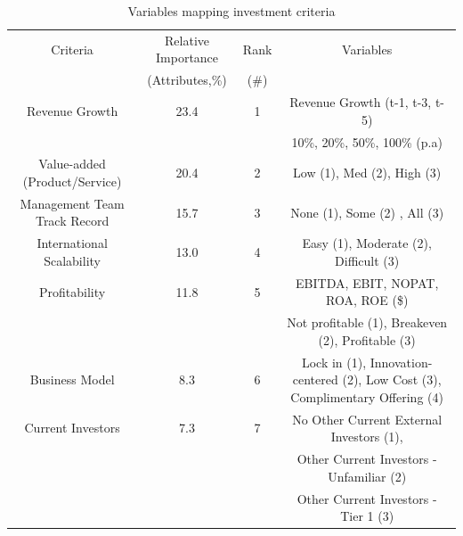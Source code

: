 \documentclass[12pt]{article}
\begin{document}
\begin{landscape}
	\begin{table}[H]
		\centering
		\begin{tabular}{|c | c | c | c|} 
		 \hline
		 Criteria & Relative Importance & Rank & Variables \\ 
				   & (Attributes,\%) 	& (\#) & \\ [0.5ex] 
		 \hline\hline
		 Revenue Growth & 23.4 & 1 & Revenue Growth (t-1, t-3, t-5) \\ 
		 				&  	   &   & 10\%, 20\%, 50\%, 100\% (p.a) \\ 
		 \hline
		 Value-added (Product/Service)& 20.4 & 2 & Low (1), Med (2), High (3) \\
		 \hline
		 Management Team Track Record& 15.7 & 3 & None (1), Some (2) , All (3) \\
		 \hline
		 International Scalability & 13.0  & 4 & Easy (1), Moderate (2), Difficult (3) \\
		 \hline
		 Profitability & 11.8 & 5 & EBITDA, EBIT, NOPAT, ROA, ROE (\$) \\ 
						 &      &   & Not profitable (1), Breakeven (2), Profitable (3) \\
		 \hline
		 Business Model & 8.3 & 6 & Lock in (1), Innovation-centered (2), Low Cost (3), Complimentary Offering (4) \\
		 \hline
		 Current Investors  & 7.3 & 7 & No Other Current External Investors (1),   \\ 
		 &  &  & Other Current Investors - Unfamiliar (2)\\
		 &  &  & Other Current Investors - Tier 1 (3)\\ [1ex]
		 \hline
		\end{tabular}
		\caption{Variables mapping investment criteria}
		\label{table:1}
		\end{table}

\end{landscape}
\end{document}

